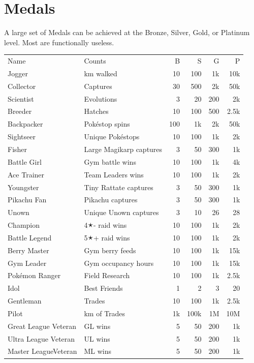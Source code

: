 \section{Medals}
\label{sec:medals}
A large set of Medals can be achieved at the Bronze, Silver, Gold, or Platinum level.
Most are functionally useless.
\begingroup
\setlength{\tabcolsep}{1pt}
\footnotesize
\begin{longtable}{m{}m{}rrrr}
Name & Counts & B & S & G & P\\
\Midrule
\endhead
Jogger & km walked & 10 & 100 & 1k & 10k\\
Collector & Captures & 30 & 500 & 2k & 50k\\
Scientist & Evolutions & 3 & 20 & 200 & 2k\\
Breeder & Hatches & 10 & 100 & 500 & 2.5k\\
Backpacker & Pokéstop spins & 100 & 1k & 2k & 50k\\
Sightseer & Unique Pokéstops & 10 & 100 & 1k & 2k\\
Fisher & Large Magikarp captures & 3 & 50 & 300 & 1k\\
Battle Girl & Gym battle wins & 10 & 100 & 1k & 4k\\
Ace Trainer & Team Leaders wins & 10 & 100 & 1k & 2k\\
Youngster & Tiny Rattate captures & 3 & 50 & 300 & 1k\\
Pikachu Fan & Pikachu captures & 3 & 50 & 300 & 1k\\
Unown & Unique Unown captures & 3 & 10 & 26 & 28\\
Champion & 4🟉- raid wins & 10 & 100 & 1k & 2k\\
Battle Legend & 5🟉+ raid wins & 10 & 100 & 1k & 2k\\
Berry Master & Gym berry feeds & 10 & 100 & 1k & 15k\\
Gym Leader & Gym occupancy hours & 10 & 100 & 1k & 15k\\
Pokémon Ranger & Field Research & 10 & 100 & 1k & 2.5k\\
Idol & Best Friends & 1 & 2 & 3 & 20\\
Gentleman & Trades & 10 & 100 & 1k & 2.5k\\
Pilot & km of Trades & 1k & 100k & 1M & 10M\\
Great League Veteran & GL wins & 5 & 50 & 200 & 1k\\
Ultra League Veteran & UL wins & 5 & 50 & 200 & 1k\\
Master League\newline{}Veteran & ML wins & 5 & 50 & 200 & 1k\\

\end{longtable}

